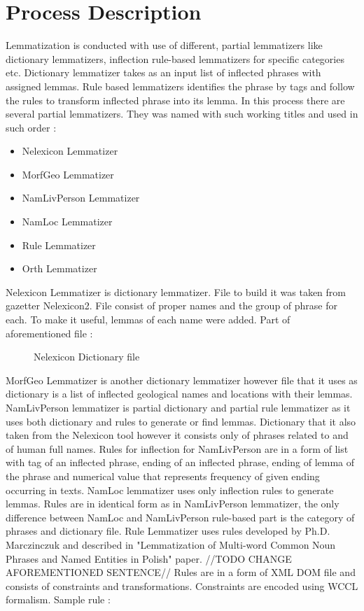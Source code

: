 \documentclass[12pt]{report}
\begin{document}
\section{Process Description}
Lemmatization is conducted with use of different, partial lemmatizers like dictionary lemmatizers, inflection rule-based lemmatizers for specific categories etc. Dictionary lemmatizer takes as an input list of inflected phrases with assigned lemmas. Rule based lemmatizers identifies the phrase by tags and follow the rules to transform inflected phrase into its lemma. In this process there are several partial lemmatizers. They was named with such working titles and used in such order : 
\begin{itemize}
	\item Nelexicon Lemmatizer
	\item MorfGeo Lemmatizer 
	\item NamLivPerson Lemmatizer
	\item NamLoc Lemmatizer
	\item Rule Lemmatizer
	\item Orth Lemmatizer
\end{itemize}
Nelexicon Lemmatizer is dictionary lemmatizer. File to build it was taken from gazetter Nelexicon2. File consist of proper names and the group of phrase for each. To make it useful, lemmas of each name were added. Part of aforementioned file : 
\begin{figure}[h]
	\centering
	\caption{Nelexicon Dictionary file}
\end{figure}
        
MorfGeo Lemmatizer is another dictionary lemmatizer however file that it uses as dictionary is a list of inflected geological names and locations with their lemmas. NamLivPerson lemmatizer is partial dictionary and partial rule lemmatizer as it uses both dictionary and rules to generate or find lemmas. Dictionary that it also taken from the Nelexicon tool however it consists only of phrases related to and of human full names. Rules for inflection for NamLivPerson are in a form of list with tag of an inflected phrase, ending of an inflected phrase, ending of lemma of the phrase and numerical value that represents frequency of given ending occurring in texts. NamLoc lemmatizer uses only inflection rules to generate lemmas. Rules are in identical form as in NamLivPerson lemmatizer, the only difference between NamLoc and NamLivPerson rule-based part is the category of phrases and dictionary file. Rule Lemmatizer uses rules developed by Ph.D. Marczinczuk and described in "Lemmatization of Multi-word Common Noun Phrases and Named Entities in Polish" paper. //TODO CHANGE AFOREMENTIONED SENTENCE// Rules are in a form of XML DOM file and consists of constraints and transformations. Constraints are encoded using WCCL formalism. Sample rule : 
        
\end{document}
